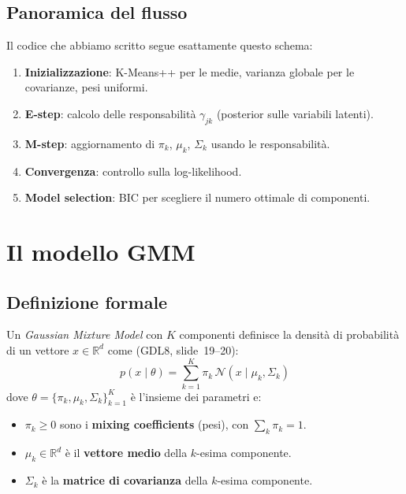 \documentclass[11pt,a4paper]{article}
\newcommand{\refslide}[2]{\textsc{#1}, slide~#2}
\begin{document}
\subsection{Panoramica del flusso}

Il codice che abbiamo scritto segue esattamente questo schema:
\begin{enumerate}[label=\arabic*.]
  \item \textbf{Inizializzazione}: K-Means++ per le medie, varianza globale
        per le covarianze, pesi uniformi.
  \item \textbf{E-step}: calcolo delle responsabilità $\gamma_{jk}$
        (posterior sulle variabili latenti).
  \item \textbf{M-step}: aggiornamento di $\pi_k$, $\mu_k$, $\Sigma_k$
        usando le responsabilità.
  \item \textbf{Convergenza}: controllo sulla log-likelihood.
  \item \textbf{Model selection}: BIC per scegliere il numero ottimale
        di componenti.
\end{enumerate}

\section{Il modello GMM}\label{sec:gmm}

\subsection{Definizione formale}

Un \emph{Gaussian Mixture Model} con $K$ componenti definisce la densità
di probabilità di un vettore $x \in \mathbb{R}^d$ come
(\refslide{GDL8}{19--20}):
\begin{equation}\label{eq:gmm}
  p(x \mid \theta) = \sum_{k=1}^{K} \pi_k \,
  \mathcal{N}(x \mid \mu_k, \Sigma_k)
\end{equation}
dove $\theta = \{\pi_k, \mu_k, \Sigma_k\}_{k=1}^{K}$ è l'insieme
dei parametri e:
\begin{itemize}[nosep]
  \item $\pi_k \ge 0$ sono i \textbf{mixing coefficients} (pesi),
        con $\sum_k \pi_k = 1$.
  \item $\mu_k \in \mathbb{R}^d$ è il \textbf{vettore medio} della
        $k$-esima componente.
  \item $\Sigma_k$ è la \textbf{matrice di covarianza} della $k$-esima
        componente.
\end{itemize}
\end{document}
